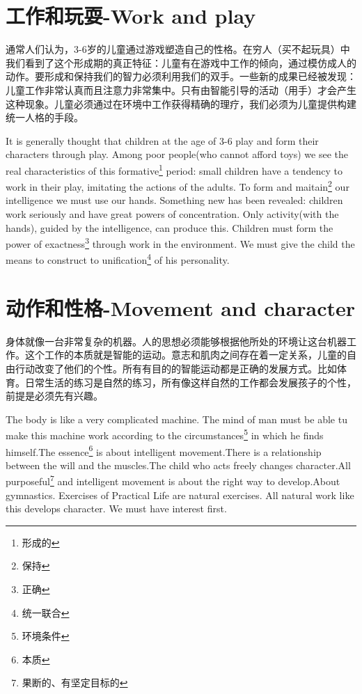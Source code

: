 \documentclass[lang=cn,10pt]{elegantbook}
\begin{document}
\chapter{工作和玩耍-Work and play}

通常人们认为，3-6岁的儿童通过游戏塑造自己的性格。在穷人（买不起玩具）中我们看到了这个形成期的真正特征：儿童有在游戏中工作的倾向，通过模仿成人的动作。要形成和保持我们的智力必须利用我们的双手。一些新的成果已经被发现：儿童工作非常认真而且注意力非常集中。只有由智能引导的活动（用手）才会产生这种现象。儿童必须通过在环境中工作获得精确的理疗，我们必须为儿童提供构建统一人格的手段。

It is generally thought that children at the age of 3-6 play and form their characters through play. Among poor people(who cannot afford toys) we see the real characteristics of this formative\footnote{形成的} period: small children have a tendency to work in their play, imitating the actions of the adults. To form and maitain\footnote{保持} our intelligence we must use our hands. Something new has been revealed: children work seriously and have great powers of concentration. Only activity(with the hands), guided by the intelligence, can produce this. Children must form the power of exactness\footnote{正确} through work in the environment. We must give the child the means to construct to unification\footnote{统一联合} of his personality.

\chapter{动作和性格-Movement and character}

身体就像一台非常复杂的机器。人的思想必须能够根据他所处的环境让这台机器工作。这个工作的本质就是智能的运动。意志和肌肉之间存在着一定关系，儿童的自由行动改变了他们的个性。所有有目的的智能运动都是正确的发展方式。比如体育。日常生活的练习是自然的练习，所有像这样自然的工作都会发展孩子的个性，前提是必须先有兴趣。

The body is like a very complicated machine. The mind of man must be able tu make this machine work according to the circumstances\footnote{环境条件} in which he finds himself.The essence\footnote{本质} is about intelligent movement.There is a relationship between the will and the muscles.The child who acts freely changes character.All purposeful\footnote{果断的、有坚定目标的} and intelligent movement is about the right way to develop.About gymnastics. Exercises of Practical Life are natural exercises. All natural work like this develops character. We must have interest first.
\end{document}
